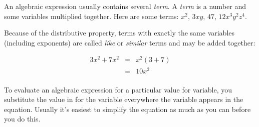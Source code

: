 \documentclass[fleqn]{article}
\begin{document}
An algebraic expression usually contains several {\em term}.  A {\em term} is a number and some variables multiplied
together.  Here are some terms: \( x^2 \), $ 3xy $,  $ 47 $, $ 12x^3y^2z^4 $.


Because of the distributive property, terms with exactly the same variables (including exponents) are called {\em like}
or {\em similar} terms and may be added together:

\begin{eqnarray*}
  3x^2 + 7x^2 & = & x^2(3 + 7) \\
              & = & 10x^2  \\
\end{eqnarray*}

To evaluate an algebraic expression for a particular value for variable, you substitute the value in for the variable
everywhere the variable appears in the equation.  Usually it's easiest to simplify the equation as much as you can before
you do this.
\end{document}
